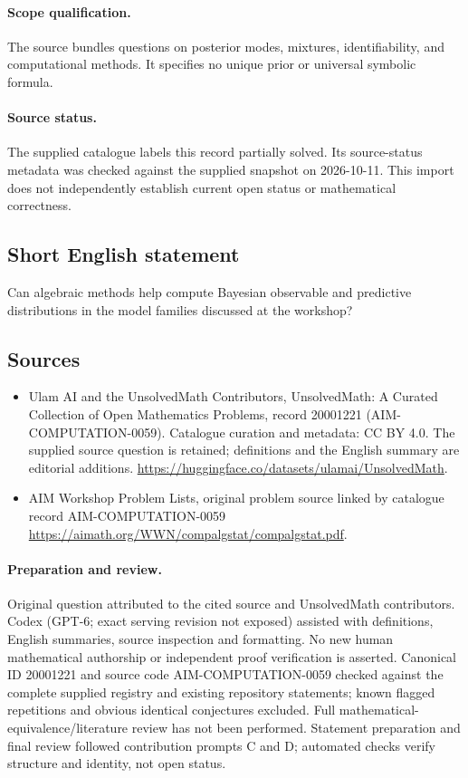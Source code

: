 \documentclass[11pt]{article}
\begin{document}
\paragraph{Scope qualification.}
The source bundles questions on posterior modes, mixtures, identifiability, and computational methods. It specifies no unique prior or universal symbolic formula.
\paragraph{Source status.}
The supplied catalogue labels this record partially solved. Its source-status metadata was checked against the supplied snapshot on 2026-10-11. This import does not independently establish current open status or mathematical correctness.
\subsection{Short English statement}
Can algebraic methods help compute Bayesian observable and predictive distributions in the model families discussed at the workshop?
\subsection{Sources}
\begin{itemize}
\item[S1] Ulam AI and the UnsolvedMath Contributors, UnsolvedMath: A Curated Collection of Open Mathematics Problems, record 20001221 (AIM-COMPUTATION-0059). Catalogue curation and metadata: CC BY 4.0. The supplied source question is retained; definitions and the English summary are editorial additions.
\url{https://huggingface.co/datasets/ulamai/UnsolvedMath}.
\item[S2] AIM Workshop Problem Lists, original problem source linked by catalogue record AIM-COMPUTATION-0059
\url{https://aimath.org/WWN/compalgstat/compalgstat.pdf}.
\end{itemize}
\paragraph{Preparation and review.}
Original question attributed to the cited source and UnsolvedMath contributors. Codex (GPT-6; exact serving revision not exposed) assisted with definitions, English summaries, source inspection and formatting. No new human mathematical authorship or independent proof verification is asserted. Canonical ID 20001221 and source code AIM-COMPUTATION-0059 checked against the complete supplied registry and existing repository statements; known flagged repetitions and obvious identical conjectures excluded. Full mathematical-equivalence/literature review has not been performed. Statement preparation and final review followed contribution prompts C and D; automated checks verify structure and identity, not open status.
\label{end:20001221}
\end{document}
